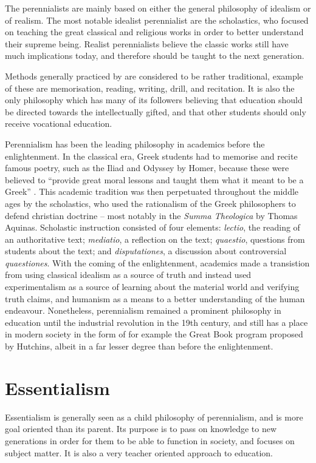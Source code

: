 The perennialists are mainly based on either the general philosophy of idealism or of realism. The most notable idealist perennialist are the scholastics, who focused on teaching the great classical and religious works in order to better understand their supreme being. Realist perennialists believe the classic works still have much implications today, and therefore should be taught to the next generation.

Methods generally practiced by are considered to be rather traditional, example of these are memorisation, reading, writing, drill, and recitation. It is also the only philosophy which has many of its followers believing that education should be directed towards the intellectually gifted, and that other students should only receive vocational education.

Perennialism has been the leading philosophy in academics before the enlightenment. In the classical era, Greek students had to memorise and recite famous poetry, such as the Iliad and Odyssey by Homer, because these were believed to ``provide great moral lessons and taught them what it meant to be a Greek'' \cite[p.139]{searchgreeks}. This academic tradition was then perpetuated throughout the middle ages by the scholastics, who used the rationalism of the Greek philosophers to defend christian doctrine -- most notably in the \emph{Summa Theologica} by Thomas Aquinas. Scholastic instruction consisted of four elements: \emph{lectio}, the reading of an authoritative text; \emph{mediatio}, a reflection on the text; \emph{quaestio}, questions from students about the text; and \emph{disputationes}, a discussion about controversial \emph{quaestiones}. With the coming of the enlightenment, academics made a transistion from using classical idealism as a source of truth and instead used experimentalism as a source of learning about the material world and verifying truth claims, and humanism as a means to a better understanding of the human endeavour. Nonetheless, perennialism remained a prominent philosophy in education until the industrial revolution in the 19th century, and still has a place in modern society in the form of for example the Great Book program proposed by Hutchins, albeit in a far lesser degree than before the enlightenment.

\section{Essentialism}

Essentialism is generally seen as a child philosophy of perennialism, and is more goal oriented than its parent. Its purpose is to pass on knowledge to new generations in order for them to be able to function in society, and focuses on subject matter. It is also a very teacher oriented approach to education.

